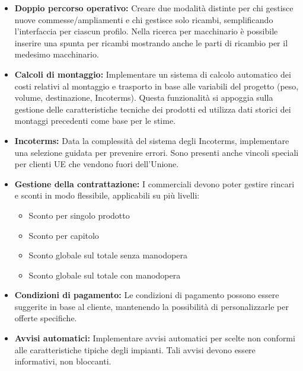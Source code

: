 \documentclass[12pt, a4paper]{article}
\begin{document}
\begin{itemize}
\begin{itemize}
                  \item \textbf{Doppio percorso operativo:} Creare due modalità distinte per chi gestisce nuove commesse/ampliamenti e chi gestisce solo ricambi, semplificando l'interfaccia per ciascun profilo. Nella ricerca per macchinario è possibile inserire una spunta per ricambi mostrando anche le parti di ricambio per il medesimo macchinario.

                  \item \textbf{Calcoli di montaggio:} Implementare un sistema di calcolo automatico dei costi relativi al montaggio e trasporto in base alle variabili del progetto (peso, volume, destinazione, Incoterms). Questa funzionalità si appoggia sulla gestione delle caratteristiche tecniche dei prodotti ed utilizza dati storici dei montaggi precedenti come base per le stime.

                  \item \textbf{Incoterms:} Data la complessità del sistema degli Incoterms, implementare una selezione guidata per prevenire errori. Sono presenti anche vincoli speciali per clienti UE che vendono fuori dell'Unione.

                  \item \textbf{Gestione della contrattazione:} I commerciali devono poter gestire rincari e sconti in modo flessibile, applicabili su più livelli:
                        \begin{itemize}
                              \item Sconto per singolo prodotto
                              \item Sconto per capitolo
                              \item Sconto globale sul totale senza manodopera
                              \item Sconto globale sul totale con manodopera
                        \end{itemize}

                  \item \textbf{Condizioni di pagamento:} Le condizioni di pagamento possono essere suggerite in base al cliente, mantenendo la possibilità di personalizzarle per offerte specifiche.

                  \item \textbf{Avvisi automatici:} Implementare avvisi automatici per scelte non conformi alle caratteristiche tipiche degli impianti. Tali avvisi devono essere informativi, non bloccanti.
            \end{itemize}


\end{itemize}
\end{document}
